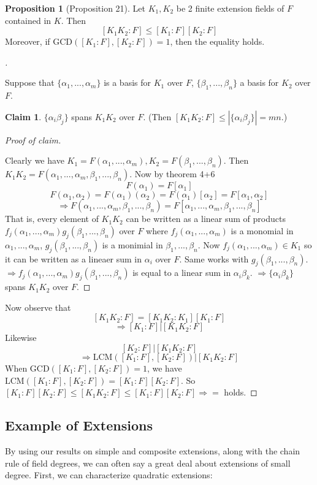 \documentclass[12pt]{article}
\theoremstyle{definition}
\newtheorem{prop}{Proposition}
\newtheorem*{clm}{Claim}
\newenvironment{proofs}[1][\proofname]{%
  \begin{proof}[#1]$ $\par\nobreak\ignorespaces
}{%
  \end{proof}
}
\begin{document}
\begin{prop}[Proposition 21]
	Let $K_1, K_2$ be 2 finite extension fields of $F$ contained in $K$.
	Then
	\[
		[K_1K_2:F] \leq [K_1:F][K_2:F]
	\]
	Moreover, if $\text{GCD}([K_1:F], [K_2:F]) = 1$, then the equality holds.
\end{prop}

\begin{proofs}
	Suppose that $\{\alpha_1, ..., \alpha_m \}$ is a basis for $K_1$ over $F$, $\{\beta_1, ..., \beta_n\}$ a basis for $K_2$ over $F$.
	\begin{clm}
		$\{\alpha_i \beta_j\}$ spans $K_1 K_2$ over $F$.
		(Then $[K_1 K_2:F] \leq |\{\alpha_i \beta_j\}| = mn$.)
	\end{clm}

	\begin{proofs}[Proof of claim]
		Clearly we have $K_1 = F(\alpha_1, ..., \alpha_m), K_2 = F(\beta_1, ..., \beta_n)$.
		Then $K_1 K_2 = F(\alpha_1, ..., \alpha_m, \beta_1, ..., \beta_n)$.
		Now by theorem 4+6
		\[
			F(\alpha_1) = F[\alpha_1]
		\]
		\[
			F(\alpha_1, \alpha_2) = F(\alpha_1)(\alpha_2) = F(\alpha_1)[\alpha_2] = F[\alpha_1, \alpha_2]
		\]
		\[
			\Rightarrow F(\alpha_1, ..., \alpha_m, \beta_1, ..., \beta_n) = F[\alpha_1, ..., \alpha_m, \beta_1, ..., \beta_n]
		\]
		That is, every element of $K_1 K_2$ can be written as a linear sum of products $f_j(\alpha_1, ..., \alpha_m) g_j(\beta_1, ..., \beta_n)$ over $F$ where $f_j(\alpha_1, ..., \alpha_m)$ is a monomial in $\alpha_1, ..., \alpha_m$, $g_j(\beta_1, ..., \beta_n)$ is a monimial in $\beta_1, ..., \beta_n$.
		Now $f_j(\alpha_1, ..., \alpha_m) \in K_1$ so it can be written as a lineaer sum in $\alpha_i$ over $F$.
		Same works with $g_j(\beta_1, ..., \beta_n)$.
		$\Rightarrow f_j(\alpha_1, ..., \alpha_m) g_j(\beta_1, ..., \beta_n)$ is equal to a linear sum in $\alpha_i \beta_k$.
		$\Rightarrow \{\alpha_i \beta_k\}$ spans $K_1 K_2$ over $F$.
	\end{proofs}
	Now observe that
	\[
		[K_1 K_2:F] = [K_1 K_2:K_1][K_1:F]
	\]
	\[
		\Rightarrow [K_1:F]|[K_1 K_2:F]
	\]
	Likewise
	\[
		[K_2:F]|[K_1 K_2:F]
	\]
	\[
		\Rightarrow \text{LCM}([K_1:F], [K_2:F]) | [K_1 K_2:F]
	\]
	When $\text{GCD}([K_1:F], [K_2:F]) = 1$, we have $\text{LCM}([K_1:F], [K_2:F]) = [K_1:F][K_2:F]$.
	So $[K_1:F][K_2:F] \leq [K_1 K_2:F] \leq [K_1:F][K_2:F] \Rightarrow = $ holds.
\end{proofs}


\subsection{Example of Extensions}
By using our results on simple and composite extensions, along with the chain rule of field degrees, we can often say a great deal about extensions of small degree. First, we can characterize quadratic extensions:
\end{document}
